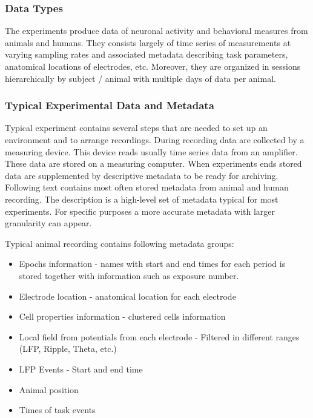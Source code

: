 \documentclass[utf8]{frontiersSCNS} %
\begin{document}
\subsubsection{Data Types}
\label{data-types}

The experiments produce data of neuronal activity and behavioral measures from animals and humans. They consists largely of time series of measurements at varying sampling rates and associated metadata describing task parameters, anatomical locations of electrodes, etc. Moreover, they are organized in sessions hierarchically by subject / animal with multiple days of data per animal.

\subsubsection{Typical Experimental Data and Metadata}
\label{typical-data-analysis-steps}

Typical experiment contains several steps that are needed to set up an environment and to arrange recordings. During recording data are collected by a measuring device. This device reads usually time series data from an amplifier. These data are stored on a measuring computer. When experiments ends stored data are supplemented by descriptive metadata to be ready for archiving. Following text contains most often stored metadata from animal and human recording. The description is a high-level set of metadata typical for most experiments. For specific purposes a more accurate metadata with larger granularity can appear.

Typical animal recording contains following metadata groups:

\begin{itemize}
 \item Epochs information - names with start and end times for each period is stored together with information such as exposure number. 
 \item Electrode location - anatomical location for each electrode
 \item Cell properties information - clustered cells information
 \item Local field from potentials from each electrode - Filtered in different ranges (LFP, Ripple, Theta, etc.)
 \item LFP Events - Start and end time
 \item Animal position
 \item Times of task events
\end{itemize}
\end{document}
